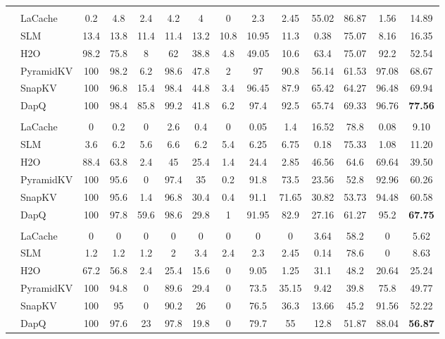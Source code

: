 \begin{table}[t]
{\begin{tabular}{>{\bfseries}c >{\raggedright}p{2.2cm} *{12}{c}}
& \multicolumn{13}{c}{\cellcolor{gray!20}\textbf{KV Cache Size = 1024}} \\
& LaCache & 0.2 & 4.8 & 2.4 & 4.2 & 4 & 0 & 2.3 & 2.45 & 55.02 & 86.87 & 1.56 & 14.89 \\
& SLM & 13.4 & 13.8 & 11.4 & 11.4 & 13.2 & 10.8 & 10.95 & 11.3 & 0.38 & 75.07 & 8.16 & 16.35 \\
& H2O & 98.2 & 75.8 & 8 & 62 & 38.8 & 4.8 & 49.05 & 10.6 & 63.4 & 75.07 & 92.2 & 52.54 \\
& PyramidKV & 100 & 98.2 & 6.2 & 98.6 & 47.8 & 2 & 97 & 90.8 & 56.14 & 61.53 & 97.08 & 68.67 \\
& SnapKV & 100 & 96.8 & 15.4 & 98.4 & 44.8 & 3.4 & 96.45 & 87.9 & 65.42 & 64.27 & 96.48 & 69.94 \\
& DapQ & 100 & 98.4 & 85.8 & 99.2 & 41.8 & 6.2 & 97.4 & 92.5 & 65.74 & 69.33 & 96.76 & \textbf{77.56} \\
& \multicolumn{13}{c}{\cellcolor{gray!20}\textbf{KV Cache Size = 512}} \\
& LaCache & 0 & 0.2 & 0 & 2.6 & 0.4 & 0 & 0.05 & 1.4 & 16.52 & 78.8 & 0.08 & 9.10 \\
& SLM & 3.6 & 6.2 & 5.6 & 6.6 & 6.2 & 5.4 & 6.25 & 6.75 & 0.18 & 75.33 & 1.08 & 11.20 \\
& H2O & 88.4 & 63.8 & 2.4 & 45 & 25.4 & 1.4 & 24.4 & 2.85 & 46.56 & 64.6 & 69.64 & 39.50 \\
& PyramidKV & 100 & 95.6 & 0 & 97.4 & 35 & 0.2 & 91.8 & 73.5 & 23.56 & 52.8 & 92.96 & 60.26 \\
& SnapKV & 100 & 95.6 & 1.4 & 96.8 & 30.4 & 0.4 & 91.1 & 71.65 & 30.82 & 53.73 & 94.48 & 60.58 \\
& DapQ & 100 & 97.8 & 59.6 & 98.6 & 29.8 & 1 & 91.95 & 82.9 & 27.16 & 61.27 & 95.2 & \textbf{67.75} \\
& \multicolumn{13}{c}{\cellcolor{gray!20}\textbf{KV Cache Size = 256}} \\
& LaCache & 0 & 0 & 0 & 0 & 0 & 0 & 0 & 0 & 3.64 & 58.2 & 0 & 5.62 \\
& SLM & 1.2 & 1.2 & 1.2 & 2 & 3.4 & 2.4 & 2.3 & 2.45 & 0.14 & 78.6 & 0 & 8.63 \\
& H2O & 67.2 & 56.8 & 2.4 & 25.4 & 15.6 & 0 & 9.05 & 1.25 & 31.1 & 48.2 & 20.64 & 25.24 \\
& PyramidKV & 100 & 94.8 & 0 & 89.6 & 29.4 & 0 & 73.5 & 35.15 & 9.42 & 39.8 & 75.8 & 49.77 \\
& SnapKV & 100 & 95 & 0 & 90.2 & 26 & 0 & 76.5 & 36.3 & 13.66 & 45.2 & 91.56 & 52.22 \\
& DapQ & 100 & 97.6 & 23 & 97.8 & 19.8 & 0 & 79.7 & 55 & 12.8 & 51.87 & 88.04 & \textbf{56.87} \\

\end{tabular}}
\end{table}
